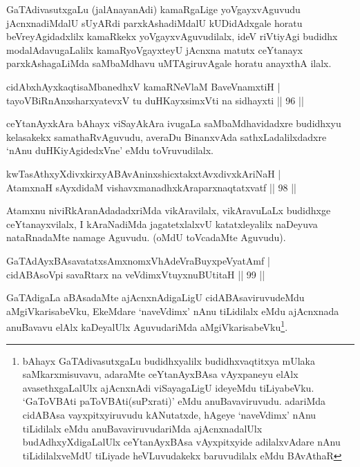 \begin{artha}
GaTAdivasutxgaLu (jalAnayanAdi) kamaRgaLige yoVgayxvAguvudu jAcnxnadiMdalU sUyARdi parxkAshadiMdalU kUDidAdxgale horatu beVreyAgidadxlilx kamaRkekx yoVgayxvAguvudilalx, ideV riVtiyAgi budidhx modalAdavugaLalilx kamaRyoVgayxteyU jAcnxna matutx ceYtanayx parxkAshagaLiMda saMbaMdhavu uMTAgiruvAgale horatu anayxthA ilalx.
\end{artha}


\begin{shl}
cidAbxhAyxkaqtisaMbanedhxV kamaRNeV\s laM BaveVnamxtiH | \\
tayoVBiRnAnxsharxyatevxV tu duHKayxsimxVti na sidhayxti \hfill ||  96 ||  
\end{shl}

\begin{artha}
ceYtanAyxkAra bAhayx viSayAkAra ivugaLa saMbaMdhavidadxre budidhxyu kelasakekx samathaRvAguvudu, averaDu BinanxvAda sathxLadalilxdadxre `nAnu duHKiyAgidedxVne' eMdu toVruvudilalx.
\end{artha}


\begin{shl}
kwTasAthxyXdivxkirxyABAvAninxshicxtakxtAvxdivxkAriNaH | \\
AtamxnaH sAyxdidaM vishavxmanadhxkAraparxnaqtatxvatf \hfill||  98 ||  
\end{shl}

\begin{artha}
Atamxnu niviRkAranAdadadxriMda vikAravilalx, vikAravuLaLx budidhxge ceYtanayxvilalx, I kAraNadiMda jagatetxlalxvU katatxleyalilx naDeyuva nataRnadaMte namage Aguvudu. (oMdU toVcadaMte Aguvudu).
\end{artha}


\begin{shl}
GaTAdAyxBAsavatatxsAmxnomxVhAdeVraBuyxpeVyatAmf | \\
cidABAsoV\s pi savaRtarx na veVdimxVtuyxnuBUtitaH \hfill||  99 ||  
\end{shl}

\begin{artha}
GaTAdigaLa aBAsadaMte ajAcnxnAdigaLigU cidABAsaviruvudeMdu aMgiVkarisabeVku, EkeMdare `naveVdimx' nAnu tiLidilalx eMdu ajAcnxnada anuBavavu elAlx kaDeyalUlx AguvudariMda aMgiVkarisabeVku\footnote{bAhayx GaTAdivasutxgaLu budidhxyalilx budidhxvaqtitxya mUlaka saMkarxmisuvavu, adaraMte ceYtanAyxBAsa vAyxpaneyu elAlx avasethxgaLalUlx ajAcnxnAdi viSayagaLigU ideyeMdu tiLiyabeVku. `GaToVBAti paToVBAti(suPxrati)' eMdu anuBavaviruvudu. adariMda cidABAsa vayxpitxyiruvudu kANutatxde, hAgeye `naveVdimx' nAnu tiLidilalx eMdu anuBavaviruvudariMda ajAcnxnadalUlx budAdhxyXdigaLalUlx ceYtanAyxBAsa vAyxpitxyide adilalxvAdare nAnu tiLidilalxveMdU tiLiyade heVLuvudakekx baruvudilalx eMdu BAvAthaR}.
\end{artha}

